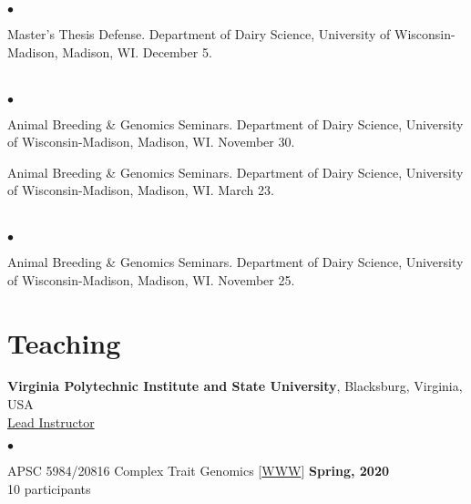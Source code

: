 \documentclass[margin,line,10pt]{res}
\newenvironment{list2}{
  \begin{list}{$\bullet$}{%
      \setlength{\itemsep}{0in}
      \setlength{\parsep}{0in} \setlength{\parskip}{0in}
      \setlength{\topsep}{0in} \setlength{\partopsep}{0in} 
      \setlength{\leftmargin}{0.2in}}}{\end{list}}
\begin{document}
\begin{resume}
\section{}
\begin{list2}
\item  Master's Thesis Defense.  Department of Dairy Science, University of Wisconsin-Madison, Madison, WI. December 5. 
\end{list2}  

\section{}
\begin{list2}
\item Animal Breeding \& Genomics Seminars.  Department of Dairy Science, University of Wisconsin-Madison, Madison, WI. November 30.
\vspace{0.5cm}
\item Animal Breeding \& Genomics Seminars.  Department of Dairy Science, University of Wisconsin-Madison, Madison, WI. March 23. 
\end{list2}

\section{}
\begin{list2}
\item  Animal Breeding \& Genomics Seminars.  Department of Dairy Science, University of Wisconsin-Madison, Madison, WI. November 25. 
\end{list2}




\vspace{0.5cm}
\section{\sc Teaching}
{\bf Virginia Polytechnic Institute and State University}, Blacksburg, Virginia, USA  \vspace{0.2cm} \\
\underline{Lead Instructor}
\vspace{0.4cm}
\begin{list2}
  
\item APSC 5984/20816 Complex Trait Genomics [\textcolor{blue}{\href{http://morotalab.org/apsc5984-2020/APSC5984.html}{WWW}}] 
  \hfill {\bf Spring, 2020} \\
         10  participants %
  

\end{list2}
\end{resume}
\end{document}
